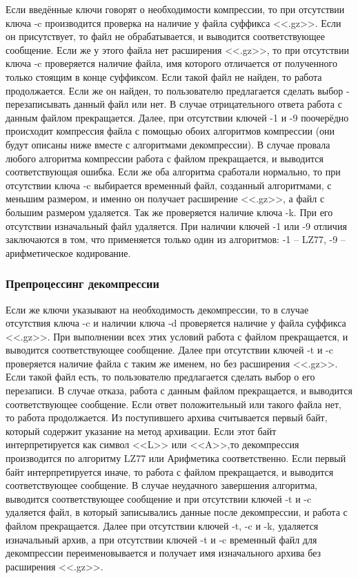 \documentclass[12pt]{article}
\begin{document}
Если введённые ключи говорят о необходимости компрессии, то при отсутствии ключа -c производится проверка на наличие у файла суффикса <<.gz>>. Если он присутствует, то файл не обрабатывается, и выводится соответствующее сообщение. Если же у этого файла нет расширения <<.gz>>, то при отсутствии ключа -c проверяется наличие файла, имя которого отличается от полученного только стоящим в конце суффиксом. Если такой файл не найден, то работа продолжается. Если же он найден, то пользователю предлагается сделать выбор - перезаписывать данный файл или нет. В случае отрицательного ответа работа с данным файлом прекращается. Далее, при отсутствии ключей -1 и -9 поочерёдно происходит компрессия файла с помощью обоих алгоритмов компрессии (они будут описаны ниже вместе с алгоритмами декомпрессии). В случае провала любого алгоритма компрессии работа с файлом прекращается, и выводится соответствующая ошибка. Если же оба алгоритма сработали нормально, то при отсутствии ключа -c выбирается временный файл, созданный алгоритмами, с меньшим размером, и именно он получает расширение <<.gz>>, а файл с большим размером удаляется. Так же проверяется наличие ключа -k. При его отсутствии изначальный файл удаляется. При наличии ключей -1 или -9 отличия заключаются в том, что применяется только один из алгоритмов: -1 -- LZ77, -9 -- арифметическое кодирование.

\subsubsection*{Препроцессинг декомпрессии}

Если же ключи указывают на необходимость декомпрессии, то в случае отсутствия ключа -c и наличии ключа -d проверяется наличие у файла суффикса <<.gz>>. При выполнении всех этих условий работа с файлом прекращается, и выводится соответствующее сообщение. Далее при отсутствии ключей -t и -c проверяется наличие файла с таким же именем, но без расширения <<.gz>>. Если такой файл есть, то пользователю предлагается сделать выбор о его перезаписи. В случае отказа, работа с данным файлом прекращается, и выводится соответствующее сообщение. Если ответ положительный или такого файла нет, то работа продолжается. Из поступившего архива считывается первый байт, который содержит указание на метод архивации. Если этот байт интерпретируется как символ <<L>> или <<A>>,то декомпрессия производится по алгоритму LZ77 или Арифметика соответственно. Если первый байт интерпретируется иначе, то работа с файлом прекращается, и выводится соответствующее сообщение. В случае неудачного завершения алгоритма, выводится соответствующее сообщение и при отсутствии ключей -t и -c удаляется файл, в который записывались данные после декомпрессии, и работа с файлом прекращается. Далее при отсутствии ключей -t, -c и -k, удаляется изначальный архив, а при отсутствии ключей -t и -c временный файл для декомпрессии переименовывается и получает имя изначального архива без расширения <<.gz>>.
\end{document}
